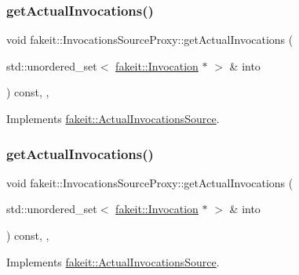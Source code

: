 \subsubsection{\texorpdfstring{getActualInvocations()}{getActualInvocations()}\hspace{0.1cm}{\footnotesize\ttfamily [1/9]}}
{\footnotesize\ttfamily void fakeit\+::\+Invocations\+Source\+Proxy\+::get\+Actual\+Invocations (\begin{DoxyParamCaption}\item[{std\+::unordered\+\_\+set$<$ \mbox{\hyperlink{structfakeit_1_1Invocation}{fakeit\+::\+Invocation}} $\ast$ $>$ \&}]{into }\end{DoxyParamCaption}) const\hspace{0.3cm}{\ttfamily [inline]}, {\ttfamily [override]}, {\ttfamily [virtual]}}



Implements \mbox{\hyperlink{structfakeit_1_1ActualInvocationsSource_a274de522e11e1f9b8d70c6e0be9e5a9b}{fakeit\+::\+Actual\+Invocations\+Source}}.

\mbox{\label{structfakeit_1_1InvocationsSourceProxy_af06b5d62b0c4ff1e3048fae5d7ddd8c3}} 
\subsubsection{\texorpdfstring{getActualInvocations()}{getActualInvocations()}\hspace{0.1cm}{\footnotesize\ttfamily [2/9]}}
{\footnotesize\ttfamily void fakeit\+::\+Invocations\+Source\+Proxy\+::get\+Actual\+Invocations (\begin{DoxyParamCaption}\item[{std\+::unordered\+\_\+set$<$ \mbox{\hyperlink{structfakeit_1_1Invocation}{fakeit\+::\+Invocation}} $\ast$ $>$ \&}]{into }\end{DoxyParamCaption}) const\hspace{0.3cm}{\ttfamily [inline]}, {\ttfamily [override]}, {\ttfamily [virtual]}}



Implements \mbox{\hyperlink{structfakeit_1_1ActualInvocationsSource_a274de522e11e1f9b8d70c6e0be9e5a9b}{fakeit\+::\+Actual\+Invocations\+Source}}.

